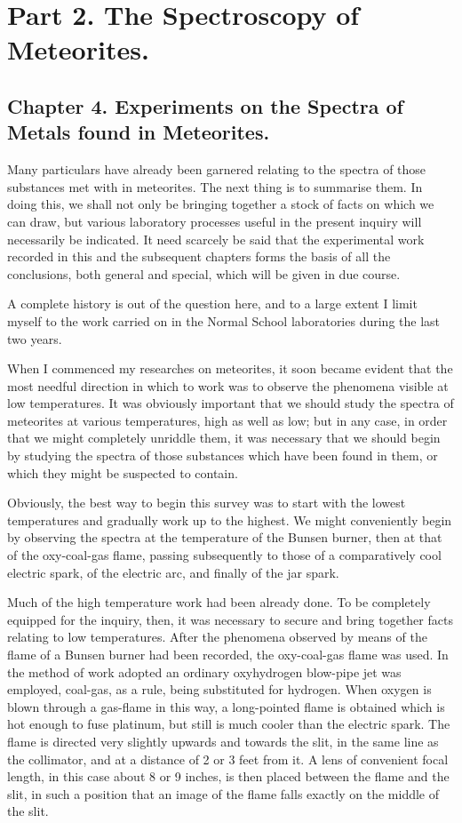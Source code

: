 \documentclass[a4paper, 12pt, oneside, polutonikogreek, english]{article}
\begin{document}
\section{Part 2. The Spectroscopy of Meteorites.}

\subsection{Chapter 4. Experiments on the Spectra of Metals found in Meteorites.}

Many particulars have already been garnered relating to the spectra of those substances met with in meteorites. The next thing is to summarise them. In doing this, we shall not only be bringing together a stock of facts on which we can draw, but various laboratory processes useful in the present inquiry will necessarily be indicated. It need scarcely be said that the experimental work recorded in this and the subsequent chapters forms the basis of all the conclusions, both general and special, which will be given in due course.

A complete history is out of the question here, and to a large extent I limit myself to the work carried on in the Normal School laboratories during the last two years.

When I commenced my researches on meteorites, it soon became evident that the most needful direction in which to work was to observe the phenomena visible at low temperatures. It was obviously important that we should study the spectra of meteorites at various temperatures, high as well as low; but in any case, in order that we might completely unriddle them, it was necessary that we should begin by studying the spectra of those substances which have been found in them, or which they might be suspected to contain.

Obviously, the best way to begin this survey was to start with the lowest temperatures and gradually work up to the highest. We might conveniently begin by observing the spectra at the temperature of the Bunsen burner, then at that of the oxy-coal-gas flame, passing subsequently to those of a comparatively cool electric spark, of the electric arc, and finally of the jar spark.

Much of the high temperature work had been already done. To be completely equipped for the inquiry, then, it was necessary to secure and bring together facts relating to low temperatures. After the phenomena observed by means of the flame of a Bunsen burner had been recorded, the oxy-coal-gas flame was used. In the method of work adopted an ordinary oxyhydrogen blow-pipe jet was employed, coal-gas, as a rule, being substituted for hydrogen. When oxygen is blown through a gas-flame in this way, a long-pointed flame is obtained which is hot enough to fuse platinum, but still is much cooler than the electric spark. The flame is directed very slightly upwards and towards the slit, in the same line as the collimator, and at a distance of 2 or 3 feet from it. A lens of convenient focal length, in this case about 8 or 9 inches, is then placed between the flame and the slit, in such a position that an image of the flame falls exactly on the middle of the slit.
\end{document}

